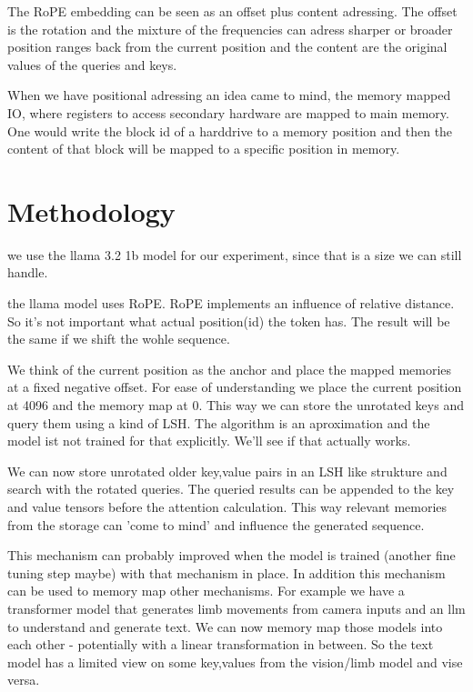 \documentclass[11pt]{article}
\begin{document}
The RoPE embedding can be seen as an offset plus content adressing. The offset is the rotation and the mixture of the frequencies can adress sharper or broader position ranges
back from the current position and the content are the original values of the queries and keys. 


When we have positional adressing an idea came to mind, the memory mapped IO, where registers to access secondary hardware are mapped to main memory. One would write the block
id of a harddrive to a memory position and then the content of that block will be mapped to a specific position in memory.






\section{Methodology}

we use the llama 3.2 1b model for our experiment, since that is a size we can still handle.

the llama model uses RoPE. RoPE implements an influence of relative distance. So it's not important what actual position(id) the
token has. The result will be the same if we shift the wohle sequence.

We think of the current position as the anchor and place the mapped memories at a fixed negative offset. For ease of understanding
we place the current position at 4096 and the memory map at 0. This way we can store the unrotated keys and query them using a kind
of LSH. The algorithm is an aproximation and the model ist not trained for that explicitly. We'll see if that actually works.

We can now store unrotated older key,value pairs in an LSH like strukture and search with the rotated queries. The queried results 
can be appended to the key and value tensors before the attention calculation. This way relevant memories from the storage can
'come to mind' and influence the generated sequence.

This mechanism can probably improved when the model is trained (another fine tuning step maybe) with that mechanism in place. In 
addition this mechanism can be used to memory map other mechanisms. For example we have a transformer model that generates limb 
movements from camera inputs and an llm to understand and generate text. We can now memory map those models into each other - potentially
with a linear transformation in between. So the text model has a limited view on some key,values from the vision/limb model and vise versa.
\end{document}
